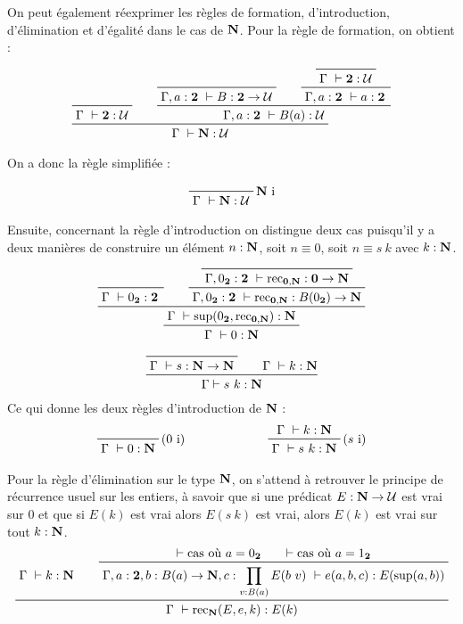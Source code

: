 \documentclass[../../rapport.tex]{subfiles}
\begin{document}
  On peut également réexprimer les règles de formation, d'introduction, d'élimination et d'égalité dans le cas de $\mathbf N$.
  Pour la règle de formation, on obtient :

  $$
  \prfinterspace=2em
  \prftree
    {\prfaxiom{\Gamma\ \vdash \2 : \U}}
    {\prftree
      {\prfaxiom{\Gamma, a : \2\ \vdash B : \2 \fun \U}}
      {\prftree
	{\prfaxiom{\Gamma\ \vdash \2 : \U}}
      {\Gamma, a : \2\ \vdash a : \2}}
    {\Gamma, a : \2\ \vdash B(a) : \U}}
  {\Gamma\ \vdash \N : \U}
  $$

  On a donc la règle simplifiée :

  $$
  \prfbyaxiom{$\N$ i}
    {\Gamma\ \vdash \N : \U}
  $$

  Ensuite, concernant la règle d'introduction on distingue deux cas puisqu'il y a deux manières de construire
  un élément $n : \mathbf N$, soit $n \equiv 0$, soit $n \equiv s\ k$ avec $k : \mathbf N$.

  $$
  \prfinterspace=2em
  \prftree
    {\prftree
      {\prfaxiom{\Gamma\ \vdash 0_{\2} : \2}}
      {\prftree
	{\prfaxiom{\Gamma, 0_{\2} : \2\ \vdash \rec_{\0, \N} : \0 \fun \N}}
      {\Gamma, 0_{\2} : \2\ \vdash \rec_{\0, \N} : B(0_{\2}) \fun \N}}
    {\Gamma\ \vdash \sup(0_{\2}, \rec_{\0, \N}) : \N}}
  {\Gamma\ \vdash 0 : \N}
  $$

  $$
  \prfinterspace=2em
  \prftree
    {\prfaxiom{\Gamma\ \vdash s : \N \fun \N}}
    {\Gamma\ \vdash k : \N}
  {\Gamma \vdash s\ k : \N}
  $$
  Ce qui donne les deux règles d'introduction de $\mathbf N$ :
  $$\begin{array}{cc}
    \prfbyaxiom{($0$ i)}{\Gamma\ \vdash 0 : \N}\hspace{2cm} & \prftree[r]{($s$ i)}{\Gamma\ \vdash k : \N}{\Gamma\ \vdash s\ k : \N}
  \end{array}$$

  Pour la règle d'élimination sur le type $\mathbf N$, on s'attend à retrouver le principe de récurrence usuel sur les entiers,
  à savoir que si une prédicat $E : \mathbf N \rightarrow \mathcal U$ est vrai sur $0$ et que si $E(k)$ est vrai alors $E(s\ k)$ est vrai,
  alors $E(k)$ est vrai sur tout $k : \mathbf N$.
  $$
  \prfinterspace=2em
  \prftree
    {\Gamma\ \vdash k : \N}
    {\prftree
      {\vdash \text{cas où $a = 0_{\2}$}}
      {\vdash \text{cas où $a = 1_{\2}$}}
    {\Gamma, a : \2, b : B(a) \fun \N, c : \prod_{v : B(a)}{E(b\ v)}\ \vdash e(a, b, c) : E(\sup(a, b))}}
    {\Gamma\ \vdash \rec_{\N}(E, e, k) : E(k)}
  $$
\end{document}
